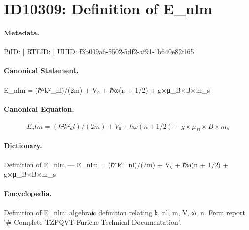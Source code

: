 \section*{ID10309: Definition of E\_nlm}
\paragraph{Metadata.}
PiID:  | RTEID:  | UUID: f3b009a6-5502-5df2-af91-1b640e82f165

\paragraph{Canonical Statement.}
E\_nlm = (ℏ²k²\_nl)/(2m) + V₀ + ℏω(n + 1/2) + g×μ\_B×B×m\_s

\paragraph{Canonical Equation.}
\[
E_nlm = (ℏ²k²_nl)/(2m) + V₀ + ℏω(n + 1/2) + g×μ_B×B×m_s
\]

\paragraph{Dictionary.}
Definition of E\_nlm — E\_nlm = (ℏ²k²\_nl)/(2m) + V₀ + ℏω(n + 1/2) + g×μ\_B×B×m\_s

\paragraph{Encyclopedia.}
Definition of E\_nlm: algebraic definition relating k, nl, m, V, ω, n. From report '\# Complete TZPQVT-Furiene Technical Documentation'.
